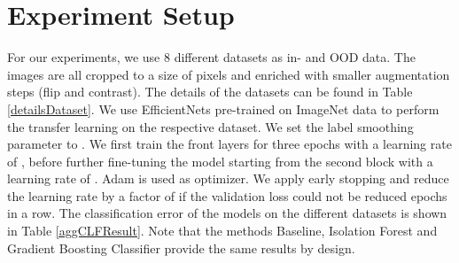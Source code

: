 \documentclass{article}
\begin{document}
\section{Experiment Setup}

For our experiments, we use 8 different datasets as in- and OOD data. The images are all cropped to a size of  pixels and enriched with smaller augmentation steps (flip and contrast). The details of the datasets can be found in Table \ref{detailsDataset}. We use EfficientNets \cite{Tan.} pre-trained on ImageNet data to perform the transfer learning on the respective dataset. We set the label smoothing parameter \cite{Szegedy.2016} to . We first train the front layers for three epochs with a learning rate of , before further fine-tuning the model starting from the second block with a learning rate of . Adam \cite{Kingma.22.12.2014} is used as optimizer. We apply early stopping and reduce the learning rate by a factor of  if the validation loss could not be reduced  epochs in a row. The classification error of the models on the different datasets is shown in Table \ref{aggCLFResult}. Note that the methods Baseline, Isolation Forest and Gradient Boosting Classifier provide the same results by design.
\end{document}
